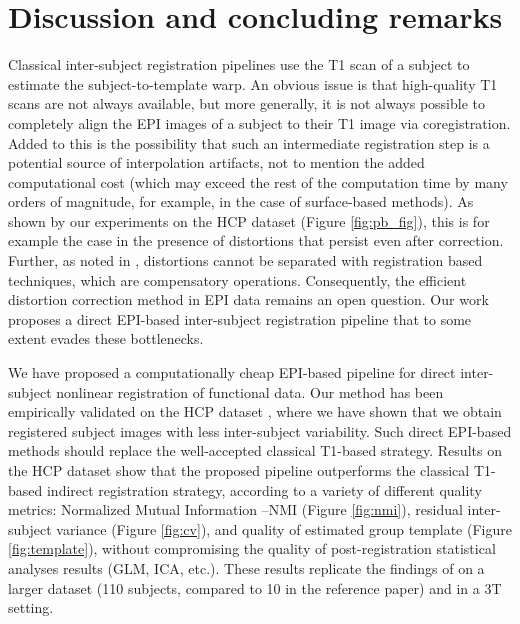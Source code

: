 \section{Discussion and concluding remarks}
\label{sec:discussion}
Classical inter-subject registration pipelines use the T1 scan of a
subject to estimate the subject-to-template warp.
%
An obvious issue is that high-quality T1 scans are not always
available, but more generally, it is not always possible to completely
align the EPI images of a subject to their T1 image via
coregistration. Added to this is the possibility that such an intermediate registration step is
a potential source of interpolation artifacts, not to mention the added computational cost (which may exceed the rest of the computation time by many orders of magnitude, for example, in the case of surface-based methods). As shown by our experiments on the HCP dataset
\citep{VanEssen20122222} (Figure \ref{fig:pb_fig}), this is for example
the case in the presence of distortions
\citep{pmid9178246,pmid12270226,zeng2002,anderson2003} that persist
even after correction.  Further, as noted in \citep{pmid25405472},
distortions cannot be separated with registration based techniques,
which are compensatory operations. Consequently, the efficient
distortion correction method in EPI data remains an
open question. Our work proposes a direct EPI-based inter-subject
registration pipeline that to some extent evades these bottlenecks.

We have proposed a computationally cheap EPI-based pipeline for direct inter-subject nonlinear registration of functional data. Our method has been empirically validated on the HCP dataset \citep{VanEssen20122222}, where we have shown that we obtain registered subject images with less inter-subject variability. Such direct EPI-based methods should replace the well-accepted classical
T1-based strategy.
Results on the HCP dataset \citep{VanEssen20122222} show that the proposed pipeline outperforms the classical T1-based indirect registration strategy, according to a variety of different quality metrics: Normalized Mutual Information --NMI (Figure \ref{fig:nmi}), residual inter-subject
variance (Figure \ref{fig:cv}), and quality of estimated group template (Figure \ref{fig:template}), without compromising the quality of post-registration statistical analyses results (GLM, ICA, etc.).
These results replicate the findings of \citep{grabner2014} on a larger dataset (110 subjects, compared to 10 in the reference paper) and in a 3T setting.


